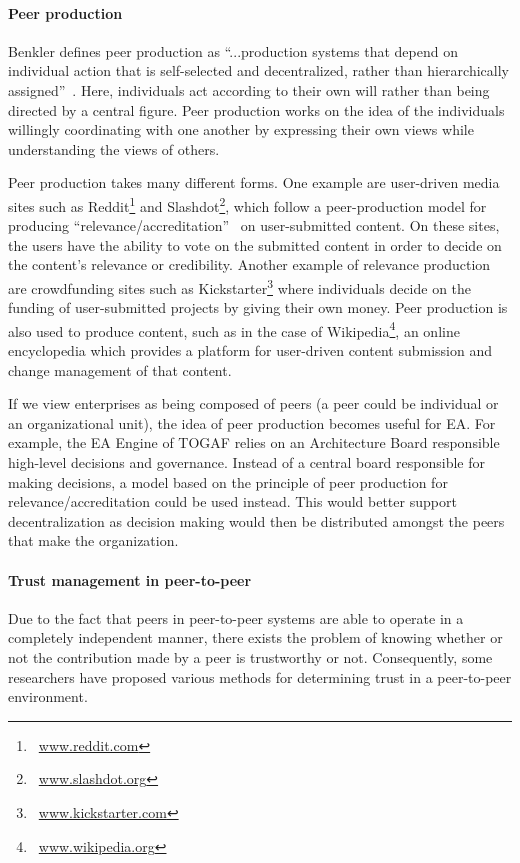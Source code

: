\paragraph*{Peer production}

Benkler defines peer production as ``...production systems that depend on individual action that is self-selected and decentralized, rather than hierarchically assigned''~\cite{benkler2006wealth}. Here, individuals act according to their own will rather than being directed by a central figure. Peer production works on the idea of the individuals willingly coordinating with one another by expressing their own views while understanding the views of others.

Peer production takes many different forms. One example are user-driven media sites such as Reddit\footnote{~\url{www.reddit.com}} and Slashdot\footnote{~\url{www.slashdot.org}}, which follow a peer-production model for producing ``relevance/accreditation''~\cite{benkler2006wealth} on user-submitted content. On these sites, the users have the ability to vote on the submitted content in order to decide on the content's relevance or credibility. Another example of relevance production are crowdfunding sites such as Kickstarter\footnote{~\url{www.kickstarter.com}} where individuals decide on the funding of user-submitted projects by giving their own money. Peer production is also used to produce content, such as in the case of Wikipedia\footnote{~\url{www.wikipedia.org}}, an online encyclopedia which provides a platform for user-driven content submission and change management of that content.

If we view enterprises as being composed of peers (a peer could be individual or an organizational unit), the idea of peer production becomes useful for EA. For example, the EA  Engine of TOGAF relies on an Architecture Board responsible high-level decisions and governance. Instead of a central board responsible for making decisions, a model based on the principle of peer production for relevance/accreditation could be used instead. This would better support decentralization as decision making would then be distributed amongst the peers that make the organization.

\paragraph*{Trust management in peer-to-peer}

Due to the fact that peers in peer-to-peer systems are able to operate in a completely independent manner, there exists the problem of knowing whether or not the contribution made by a peer is trustworthy or not. Consequently, some researchers have proposed various methods for determining trust in a peer-to-peer environment.

